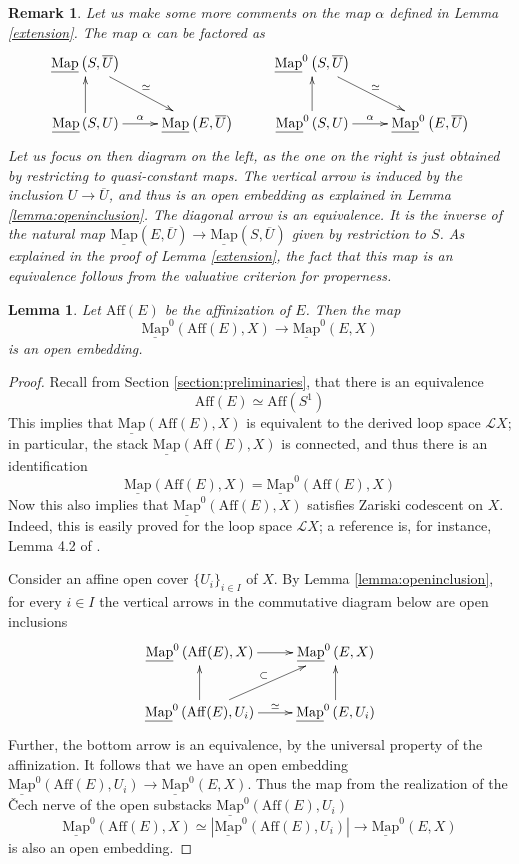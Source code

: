 \documentclass[11pt,letterpaper]{amsart}
\newtheorem{lemma}[dummy]{Lemma}
\newtheorem{remark}[dummy]{Remark}
\newcommand{\cL}{\mathcal{L}}
\newcommand{\Map}[2]{\underline{\mathrm{Map}}\left (#1,#2\right )}
\newcommand{\Mapo}[2]{\underline{\mathrm{Map}}^{0}\left (#1,#2\right )}
\begin{document}
\begin{remark}
Let us make some more comments on the map $\alpha$ defined in Lemma \ref{extension}. 
The map $\alpha$ can be factored as 
$$
\xymatrix{
\Map{S}{\overline{U}}  \ar[dr]^-\simeq & &  \Mapo{S}{\overline{U}} \ar[dr]^-\simeq & \\
\Map{S}{U} \ar[r]^-\alpha \ar[u] & \Map{E}{\overline{U}}  & \Mapo{S}{U}  \ar[r]^-\alpha \ar[u]& \Mapo{E}{\overline{U}}
}
$$
Let us focus on then diagram on the left, as the one on the right is just obtained by restricting to quasi-constant maps. The vertical arrow is induced by the inclusion $U \to \overline{U}$, and thus is an open embedding as explained in Lemma \ref{lemma:openinclusion}. The diagonal arrow is an equivalence. It is the inverse of the natural map $\Map{E}{\overline{U}} \to \Map{S}{\overline{U}}$ given by restriction to $S$. As  explained in the proof of Lemma \ref{extension}, the fact that this map is an equivalence follows from the valuative criterion for properness.
\end{remark}

\begin{lemma}
\label{affopen}
Let $\mathrm{Aff}(E)$ be the affinization of $E$. Then the map
$$
\Mapo{\mathrm{Aff}(E)}{X} \to \Mapo{E}{X} 
$$
is an open embedding.
\end{lemma}
\begin{proof}
Recall from Section \ref{section:preliminaries}, that there is an equivalence 
$$
\mathrm{Aff}(E) \simeq \mathrm{Aff}(S^1)
$$
This implies  that $\Map{\mathrm{Aff}(E)}{X}$ is equivalent to the derived loop space $\cL X$; in particular, the stack $\Map{\mathrm{Aff}(E)}{X}$ is connected, and thus there is an identification
$$\Map{\mathrm{Aff}(E)}{X} = \Mapo{\mathrm{Aff}(E)}{X}$$  
Now this also implies that $\Mapo{\mathrm{Aff}(E)}{X}$ satisfies Zariski codescent on $X$. Indeed, this is easily proved for the loop space  $\cL X$; a reference  is, for instance, Lemma 4.2 of \cite{BZNLoopConn}. 

Consider an affine open cover $\{U_i\}_{i \in I}$ of $X$. By Lemma \ref{lemma:openinclusion}, for every $i \in I$ the vertical arrows in the commutative diagram below are open inclusions 
$$
\xymatrix{
\Mapo{\mathrm{Aff}(E)}{X} \ar[r] & \Mapo{E}{X} \\
\Mapo{\mathrm{Aff}(E)}{U_i} \ar[ur]^-\subset \ar[r]^-\simeq \ar[u] & \Mapo{E}{U_i} \ar[u]
}
$$
Further, the bottom arrow is an equivalence, by the universal property of the affinization. It follows that we have an open embedding 
$\Mapo{\mathrm{Aff}(E)}{U_i} \to \Mapo{E}{X}$. Thus the map from the realization of the \v{C}ech nerve of the open substacks $\Mapo{\mathrm{Aff}(E)}{U_i}$  
$$
\Mapo{\mathrm{Aff}(E)}{X} \simeq |\Mapo{\mathrm{Aff}(E)}{U_i} | \longrightarrow \Mapo{E}{X} 
$$
is also an open embedding.
\end{proof}
 
\end{document}
